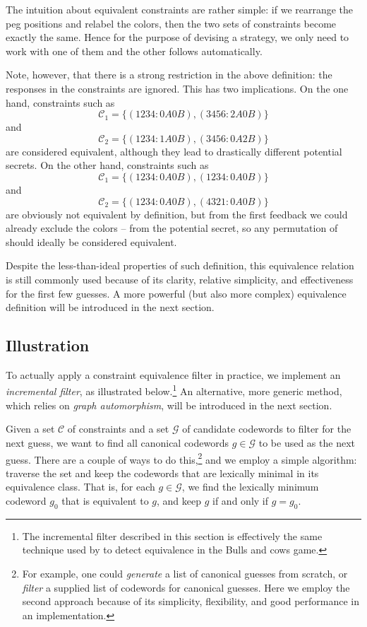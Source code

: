 The intuition about equivalent constraints are rather simple: if we rearrange the peg positions and relabel the colors, then the two sets of constraints become exactly the same. Hence for the purpose of devising a strategy, we only need to work with one of them and the other follows automatically.

Note, however, that there is a strong restriction in the above definition: the responses in the constraints are ignored. This has two implications. On the one hand, constraints such as 
\[
\mathcal{C}_1 = \{ (1234:0A0B), (3456:2A0B) \}
\]
and
\[
\mathcal{C}_2 = \{ (1234:1A0B), (3456:0A2B) \}
\]
are considered equivalent, although they lead to drastically different potential secrets. On the other hand, constraints such as
\[
\mathcal{C}_1 = \{ (1234:0A0B), (1234:0A0B) \}
\]
and
\[
\mathcal{C}_2 = \{ (1234:0A0B), (4321:0A0B) \}
\]
are obviously not equivalent by definition, but from the first feedback  we could already exclude the colors  --  from the potential secret, so any permutation of  should ideally be considered equivalent.

Despite the less-than-ideal properties of such definition, this equivalence relation is still commonly used \cite{neuwirth81,koyama93,francis10} because of its clarity, relative simplicity, and effectiveness for the first few guesses. A more powerful (but also more complex) equivalence definition will be introduced in the next section.

\subsection{Illustration}

To actually apply a constraint equivalence filter in practice, we implement an \emph{incremental filter}, as illustrated below.\footnote{The incremental filter described in this section is effectively the same technique used by \cite{francis10} to detect equivalence in the Bulls and cows game.}
An alternative, more generic method, which relies on \emph{graph automorphism}, will be introduced in the next section.

Given a set $\mathcal{C}$ of constraints and a set $\mathcal{G}$ of candidate codewords to filter for the next guess, we want to find all canonical codewords $g \in \mathcal{G}$ to be used as the next guess. There are a couple of ways to do this,\footnote{For example, one could \emph{generate} a list of canonical guesses from scratch, or \emph{filter} a supplied list of codewords for canonical guesses. Here we employ the second approach because of its simplicity, flexibility, and good performance in an implementation.}
and we employ a simple algorithm: traverse the set and keep the codewords that are lexically minimal in its equivalence class. That is, for each $g \in \mathcal{G}$, we find the lexically minimum codeword $g_0$ that is equivalent to $g$, and keep $g$ if and only if $g = g_0$. 

